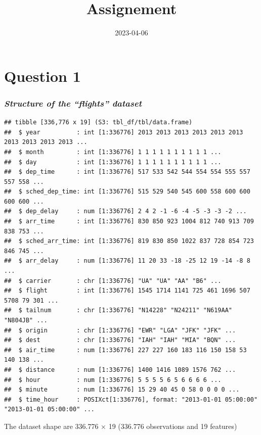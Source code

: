 \documentclass[
]{article}
\title{Assignement}
\author{}
\date{\vspace{-2.5em}2023-04-06}
\begin{document}
\maketitle

\hypertarget{question-1}{%
\section{Question 1}\label{question-1}}

\hypertarget{structure-of-the-flights-dataset}{%
\subsubsection{\texorpdfstring{\emph{Structure of the ``flights''
dataset}}{Structure of the ``flights'' dataset}}\label{structure-of-the-flights-dataset}}

\begin{verbatim}
## tibble [336,776 x 19] (S3: tbl_df/tbl/data.frame)
##  $ year          : int [1:336776] 2013 2013 2013 2013 2013 2013 2013 2013 2013 2013 ...
##  $ month         : int [1:336776] 1 1 1 1 1 1 1 1 1 1 ...
##  $ day           : int [1:336776] 1 1 1 1 1 1 1 1 1 1 ...
##  $ dep_time      : int [1:336776] 517 533 542 544 554 554 555 557 557 558 ...
##  $ sched_dep_time: int [1:336776] 515 529 540 545 600 558 600 600 600 600 ...
##  $ dep_delay     : num [1:336776] 2 4 2 -1 -6 -4 -5 -3 -3 -2 ...
##  $ arr_time      : int [1:336776] 830 850 923 1004 812 740 913 709 838 753 ...
##  $ sched_arr_time: int [1:336776] 819 830 850 1022 837 728 854 723 846 745 ...
##  $ arr_delay     : num [1:336776] 11 20 33 -18 -25 12 19 -14 -8 8 ...
##  $ carrier       : chr [1:336776] "UA" "UA" "AA" "B6" ...
##  $ flight        : int [1:336776] 1545 1714 1141 725 461 1696 507 5708 79 301 ...
##  $ tailnum       : chr [1:336776] "N14228" "N24211" "N619AA" "N804JB" ...
##  $ origin        : chr [1:336776] "EWR" "LGA" "JFK" "JFK" ...
##  $ dest          : chr [1:336776] "IAH" "IAH" "MIA" "BQN" ...
##  $ air_time      : num [1:336776] 227 227 160 183 116 150 158 53 140 138 ...
##  $ distance      : num [1:336776] 1400 1416 1089 1576 762 ...
##  $ hour          : num [1:336776] 5 5 5 5 6 5 6 6 6 6 ...
##  $ minute        : num [1:336776] 15 29 40 45 0 58 0 0 0 0 ...
##  $ time_hour     : POSIXct[1:336776], format: "2013-01-01 05:00:00" "2013-01-01 05:00:00" ...
\end{verbatim}

The dataset shape are 336.776 × 19 (336.776 observations and 19
features)
\end{document}
